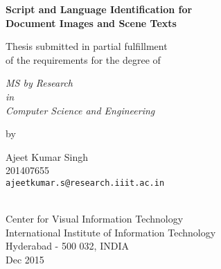 \thispagestyle{empty}
\begin{center}
\vspace*{1.0cm}
{\Large \bf Script and Language Identification for \\ Document Images and Scene Texts}

\vspace*{3.75cm}
{\large Thesis submitted in partial fulfillment\\}
{\large  of the requirements for the degree of \\}

\vspace*{1cm}
{\it {\large MS by Research} \\
{\large in\\}
{\large Computer Science and Engineering \\}}

\vspace*{1cm}
{\large by}

\vspace*{5mm}
{\large Ajeet Kumar Singh\\}
{\large 201407655\\
{\small \tt ajeetkumar.s@research.iiit.ac.in}}


\vspace*{4.0cm}
{\\}
{\large Center for Visual Information Technology\\}
{\large International Institute of Information Technology\\}
{\large Hyderabad - 500 032, INDIA\\}
{\large Dec 2015\\}
\end{center}